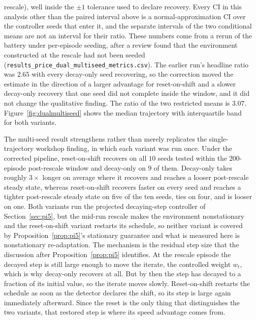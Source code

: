 rescale), well inside the $\pm 1$ tolerance used to declare recovery. Every CI in this analysis other than the paired interval above is a normal-approximation CI over the controller seeds that enter it, and the separate intervals of the two conditional means are not an interval for their ratio. These numbers come from a rerun of the battery under per-episode seeding, after a review found that the environment constructed at the rescale had not been seeded (\texttt{results\_\allowbreak price\_\allowbreak dual\_\allowbreak multiseed\_\allowbreak metrics.csv}). The earlier run's headline ratio was $2.65$ with every decay-only seed recovering, so the correction moved the estimate in the direction of a larger advantage for reset-on-shift and a slower decay-only recovery that one seed did not complete inside the window, and it did not change the qualitative finding. The ratio of the two restricted means is $3.07$. Figure~\ref{fig:dualmultiseed} shows the median trajectory with interquartile band for both variants.

The multi-seed result strengthens rather than merely replicates the single-trajectory workshop finding, in which each variant was run once. Under the corrected pipeline, reset-on-shift recovers on all $10$ seeds tested within the $200$-episode post-rescale window and decay-only on $9$ of them. Decay-only takes roughly $3\times$ longer on average where it recovers and reaches a looser post-rescale steady state, whereas reset-on-shift recovers faster on every seed and reaches a tighter post-rescale steady state on five of the ten seeds, ties on four, and is looser on one. Both variants run the projected decaying-step controller of Section~\ref{sec:pi5}, but the mid-run rescale makes the environment nonstationary and the reset-on-shift variant restarts its schedule, so neither variant is covered by Proposition~\ref{prop:pi5}'s stationary guarantee and what is measured here is nonstationary re-adaptation. The mechanism is the residual step size that the discussion after Proposition~\ref{prop:pi5} identifies. At the rescale episode the decayed step is still large enough to move the iterate, the controlled weight $w_t$, which is why decay-only recovers at all. But by then the step has decayed to a fraction of its initial value, so the iterate moves slowly. Reset-on-shift restarts the schedule as soon as the detector declares the shift, so its step is large again immediately afterward. Since the reset is the only thing that distinguishes the two variants, that restored step is where its speed advantage comes from.

